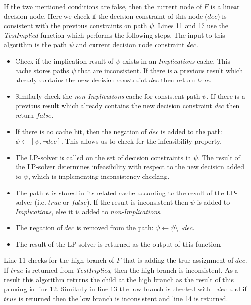 \documentclass[twoside,11pt]{article}
\begin{document}
If the two mentioned conditions are false, then the current node of $F$ is a linear decision node. Here we check if the decision constraint of this node ($\mathit{dec}$) is consistent with the previous constraints on path $\psi$. 
Lines 11 and 13 use the \emph{TestImplied} function which performs the following steps. The input to this algorithm is the path $\psi$ and current decision node constraint $\mathit{dec}$. 
\begin{itemize}
\item Check if the implication result of $\psi$ exists in an \emph{Implications} cache. This cache stores paths $\psi$ that are inconsistent. If there is a previous result which already contains the new decision constraint $\mathit{dec}$ then return $\mathit{true}$.
\item Similarly check the \emph{non-Implications} cache for consistent path $\psi$. If there is a previous result which already contains the new decision constraint $\mathit{dec}$ then return $\mathit{false}$.
\item If there is no cache hit, then the negation of $\mathit{dec}$ is added to the path: $\psi \longleftarrow \left[ \psi, \neg \mathit{dec} \right]$. This allows us to check for the infeasibility property.
\item The LP-solver is called on the set of decision constraints in $\psi$. The result of the LP-solver determines infeasibility with respect to the new decision added to $\psi$, which is implementing inconsistency checking. 
\item The path $\psi$ is stored in its related cache according to the result of the LP-solver (i.e. $\mathit{true}$ or $\mathit{false}$). If the result is inconsistent then $\psi$ is added to \emph{Implications}, else it is added to \emph{non-Implications}.
\item The negation of $\mathit{dec}$ is removed from the path: $\psi \longleftarrow \psi \setminus \neg \mathit{dec}$.
\item The result of the LP-solver is returned as the output of this function.
\end{itemize}
Line 11 checks for the high branch of $F$ that is adding the true assignment of $\mathit{dec}$. If $\mathit{true}$ is returned from \emph{TestImplied}, then the high branch is inconsistent. As a result this algorithm returns the child at the high branch as the result of this pruning in line 12. Similarly in line 13 the low branch is checked with  $\neg \mathit{dec}$ and if $\mathit{true}$ is returned then the low branch is inconsistent and line 14 is returned.
\end{document}
